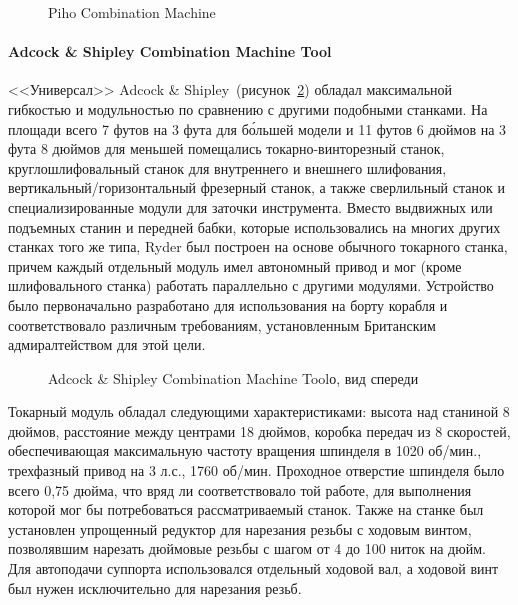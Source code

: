 \begin{figure}[ht]
	\caption{Piho Combination Machine}\label{fig:piho}
\end{figure}

\paragraph{Adcock \& Shipley Combination Machine Tool}

<<Универсал>> Adcock \& Shipley~(рисунок~\cref{fig:adcock-1}) обладал максимальной гибкостью и модульностью по сравнению с другими подобными станками. На площади всего 7 футов на 3 фута для б\'ольшей модели и 11 футов 6 дюймов на 3 фута 8 дюймов для меньшей помещались токарно-винторезный станок, круглошлифовальный станок для внутреннего и внешнего шлифования, вертикальный/горизонтальный фрезерный станок, а также сверлильный станок и специализированные модули для заточки инструмента. Вместо выдвижных или подъемных станин и передней бабки, которые использовались на многих других станках того же типа, Ryder был построен на основе обычного токарного станка, причем каждый отдельный модуль имел автономный привод и мог (кроме шлифовального станка) работать параллельно с другими модулями. Устройство было первоначально разработано для использования на борту корабля и соответствовало различным требованиям, установленным Британским адмиралтейством для этой цели. 

\begin{figure}[ht]
	\caption{Adcock \& Shipley Combination Machine Toolо, вид спереди}\label{fig:adcock-1}
\end{figure}

Токарный модуль обладал следующими характеристиками: высота над станиной 8 дюймов, расстояние между центрами 18 дюймов, коробка передач из 8 скоростей, обеспечивающая максимальную частоту вращения шпинделя в 1020 об/мин., трехфазный привод на 3 л.с., 1760 об/мин. Проходное отверстие шпинделя было всего 0,75 дюйма, что вряд ли соответствовало той работе, для выполнения которой мог бы потребоваться рассматриваемый станок. Также на станке был установлен упрощенный редуктор для нарезания резьбы с ходовым винтом, позволявшим нарезать дюймовые резьбы с шагом от 4 до 100 ниток на дюйм. Для автоподачи суппорта использовался отдельный ходовой вал, а ходовой винт был нужен исключительно для нарезания резьб.

